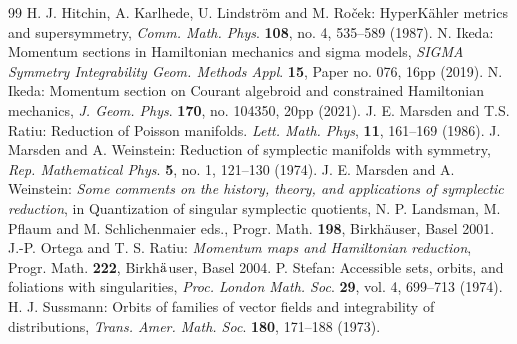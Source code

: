 \documentclass[a4paper,11pt,dvipdfmx]{article}
\numberwithin{equation}{section}
\begin{document}
\begin{thebibliography}{99}
 H. J. Hitchin, A. Karlhede, U. Lindstr\"{o}m and M. Ro\v{c}ek: {HyperK\"{a}hler metrics and supersymmetry}, {\em Comm. Math. Phys}. {\bf 108}, no. 4, 535--589 (1987). 
 N. Ikeda: {Momentum sections in Hamiltonian mechanics and sigma models}, {\em SIGMA Symmetry Integrability Geom. Methods Appl}. {\bf 15}, Paper no. 076, 16pp (2019).
 N. Ikeda: {Momentum section on Courant algebroid and constrained Hamiltonian mechanics}, {\em J. Geom. Phys}. {\bf 170}, no. 104350, 20pp (2021).
 J. E. Marsden and T.S. Ratiu: {Reduction of Poisson manifolds}. {\em Lett. Math. Phys}, {\bf 11}, 161--169 (1986). %
 J. Marsden and A. Weinstein: {Reduction of symplectic manifolds with symmetry}, {\em Rep. Mathematical Phys}. {\bf 5}, no. 1, 121--130 (1974). 
 J. E. Marsden and A. Weinstein: {\em Some comments on the history, theory, and applications of symplectic reduction}, in 
{Quantization of singular symplectic quotients}, N. P. Landsman, M. Pflaum and M. Schlichenmaier eds., Progr. Math. {\bf 198}, Birkh\"{a}user, Basel 2001. 
 J.-P. Ortega and T. S. Ratiu: {\em Momentum maps and Hamiltonian reduction}, Progr. Math. {\bf 222}, Birkh$\ddot{\rm a}$user, Basel 2004. 
 P. Stefan: {Accessible sets, orbits, and foliations with singularities}, {\em Proc. London Math. Soc}. {\bf 29}, vol. 4,  699--713 (1974). 
 H. J. Sussmann: {Orbits of families of vector fields and integrability of distributions}, {\em Trans. Amer. Math. Soc}. {\bf 180}, 171--188 (1973). 
\end{thebibliography}
\end{document}
